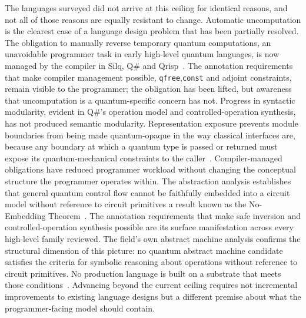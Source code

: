 The languages surveyed did not arrive at this ceiling for identical reasons, and not all of those reasons are equally resistant to change.
Automatic uncomputation is the clearest case of a language design problem that has been partially resolved.
The obligation to manually reverse temporary quantum computations, an unavoidable programmer task in early high-level quantum languages, is now managed by the compiler in Silq, Q\# and Qrisp~\cite{bichsel2020silq, MicrosoftQSharpOverview, seidel2024qrisp}.
The annotation requirements that make compiler management possible, \texttt{qfree},\texttt{const} and adjoint constraints, remain visible to the programmer; the obligation has been lifted, but awareness that uncomputation is a quantum-specific concern has not.
Progress in syntactic modularity, evident in Q\#'s operation model and controlled-operation synthesis, has not produced semantic modularity.
Representation exposure prevents module boundaries from being made quantum-opaque in the way classical interfaces are, because any boundary at which a quantum type is passed or returned must expose its quantum-mechanical constraints to the caller~\cite{scott2009plp, yuan2025foundationalabstractions}.
Compiler-managed obligations have reduced programmer workload without changing the conceptual structure the programmer operates within.
The abstraction analysis establishes that general quantum control flow cannot be faithfully embedded into a circuit model without reference to circuit primitives a result known as the No-Embedding Theorem~\cite{yuan2025foundationalabstractions}.
The annotation requirements that make safe inversion and controlled-operation synthesis possible are its surface manifestation across every high-level family reviewed.
The field's own abstract machine analysis confirms the structural dimension of this picture: no quantum abstract machine candidate satisfies the criteria for symbolic reasoning about operations without reference to circuit primitives.
No production language is built on a substrate that meets those conditions~\cite{nunez_corrales2025betterabstractmachines}.
Advancing beyond the current ceiling requires not incremental improvements to existing language designs but a different premise about what the programmer-facing model should contain.

